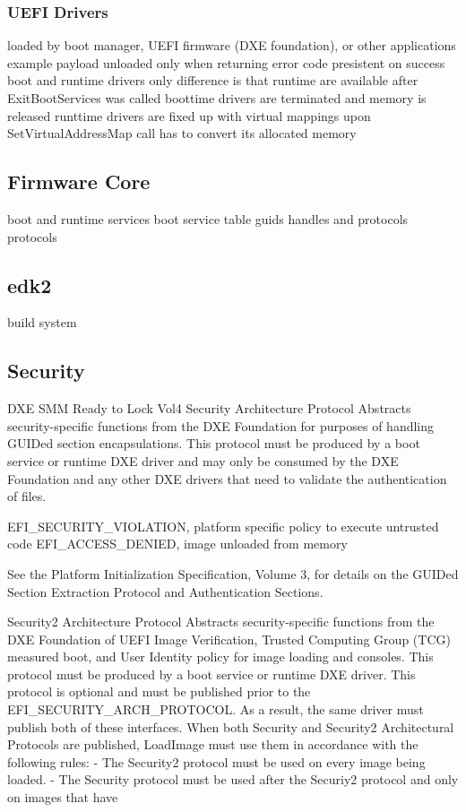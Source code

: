 \subsubsection{UEFI Drivers}

loaded by boot manager, UEFI firmware (DXE foundation), or other applications
example payload
unloaded only when returning error code
presistent on success
boot and runtime drivers
only difference is that runtime are available after ExitBootServices was called
boottime drivers are terminated and memory is released
runttime drivers are fixed up with virtual mappings upon SetVirtualAddressMap call
has to convert its allocated memory

\subsection{Firmware Core}

boot and runtime services
boot service table
guids
handles and protocols
protocols

\subsection{edk2}
build system

\subsection{Security}
DXE SMM Ready to Lock Vol4
Security Architecture Protocol
Abstracts security-specific functions from the DXE Foundation for purposes of handling GUIDed
section encapsulations. This protocol must be produced by a boot service or runtime DXE driver
and may only be consumed by the DXE Foundation and any other DXE drivers that need to validate
the authentication of files.

EFI_SECURITY_VIOLATION, platform specific policy to execute untrusted code
EFI_ACCESS_DENIED, image unloaded from memory

See the Platform Initialization Specification, Volume 3, for details on
the GUIDed Section Extraction Protocol and Authentication Sections.

Security2 Architecture Protocol
Abstracts security-specific functions from the DXE Foundation of UEFI Image Verification,
Trusted Computing Group (TCG) measured boot, and User Identity policy for image loading and
consoles. This protocol must be produced by a boot service or runtime DXE driver.
This protocol is optional and must be published prior to the EFI_SECURITY_ARCH_PROTOCOL.
As a result, the same driver must publish both of these interfaces.
When both Security and Security2 Architectural Protocols are published, LoadImage must use
them in accordance with the following rules:
- The Security2 protocol must be used on every image being loaded.
- The Security protocol must be used after the Securiy2 protocol and only on images that have

